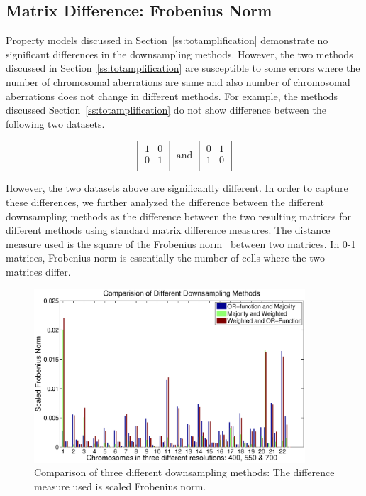 \subsection{Matrix Difference: Frobenius Norm}
\label{ss:0to1}
Property models discussed in Section~\ref{ss:totamplification} demonstrate no significant differences in the downsampling methods. However, the two methods discussed in Section~\ref{ss:totamplification} are susceptible to some errors where the number of chromosomal aberrations are same and also number of chromosomal aberrations does not change in different methods. For example, the methods discussed Section~\ref{ss:totamplification} do not show difference between the following two datasets. 

\begin{equation*}
  \begin{bmatrix}
    1 & 0  \\
    0 & 1  \\    
  \end{bmatrix} \mbox{ and }
   \begin{bmatrix}
   0 & 1  \\
   1 & 0  \\    
  \end{bmatrix}
\end{equation*}

However, the two datasets above are significantly different. In order to capture these differences, we further analyzed the difference between the different downsampling methods as the difference between the two resulting matrices for different methods using standard matrix difference measures. The distance measure used is the square of the Frobenius norm~\cite{frobenius} between two matrices. In \mbox{0-1} matrices, Frobenius norm is essentially the number of cells where the two matrices differ. 

\begin{figure}[h!]
\centering
\includegraphics[width=0.9\textwidth]{figures/frobeniusnorm1}
\caption[Frobenius norm]{Comparison of three different downsampling methods: The difference measure used is scaled Frobenius norm.}\label{Fig:frobenius}
\end{figure}

